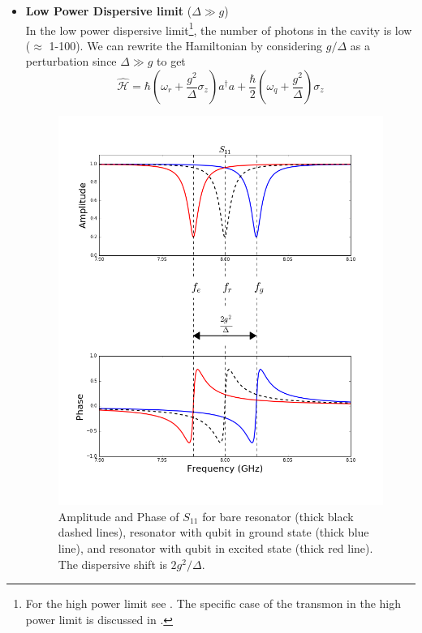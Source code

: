 \begin{itemize}
\item \textbf{Low Power Dispersive limit} ($\Delta\gg g$)\\
In the low power dispersive limit\footnote{For the high power limit see \cite{Bishop2010}. The specific case of the transmon in the high power limit is discussed in \cite{Boissonneault2010}.}, the number of photons in the cavity is low ($\approx$ 1-100). We can rewrite the Hamiltonian by considering $g/\Delta$ as a perturbation since $\Delta\gg g$ \cite{Schuster2007} to get
\begin{equation}
\hat{\mathcal{H}}=\hbar\left(\omega_r+\frac{g^2}{\Delta}\sigma_z\right)a^\dag a+\frac{\hbar}{2}\left(\omega_q+\frac{g^2}{\Delta}\right)\sigma_z
\label{eqn:dispersive hamiltonian}
\end{equation}

\begin{figure}
\centering
\includegraphics[width=\linewidth]{Figures/dispersive_shift.png}
\decoRule
\caption[Dispersive Shift]{Amplitude and Phase of $S_{11}$ for bare resonator (thick black dashed lines), resonator with qubit in ground state (thick blue line), and resonator with qubit in excited state (thick red line). The dispersive shift is $2g^2/\Delta$.}
\label{fig:dispersive shift}
\end{figure}


\end{itemize}
